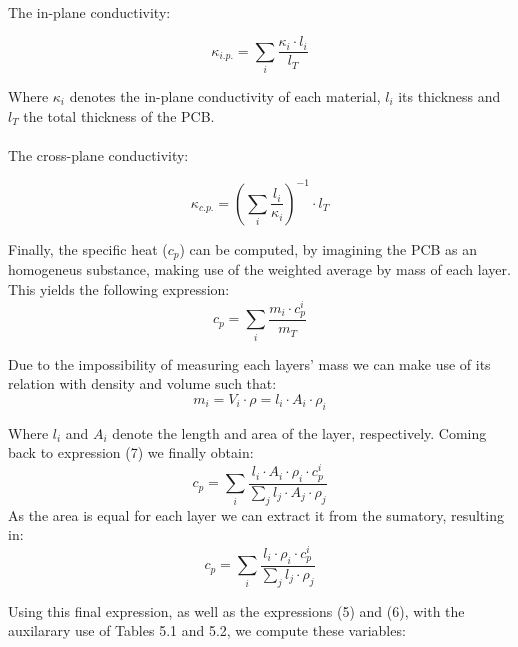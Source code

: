 \paragraph{}
The in-plane conductivity:

\begin{equation}
    \kappa_{i.p.}=\sum_i \frac{\kappa_i \cdot l_i }{l_T}
\end{equation}

Where $\kappa_i$ denotes the in-plane conductivity of each material, $l_i$ its thickness and $l_T$ the total thickness
of the PCB.

\paragraph{}
The cross-plane conductivity:

\begin{equation}
    \kappa_{c.p.}=\left( \sum_i \frac{l_i}{\kappa_i} \right)^{-1} \cdot l_T
\end{equation}

Finally, the specific heat ($c_p$) can be computed, by imagining the PCB as an homogeneus substance, making
use of the weighted average by mass of each layer. This yields the following expression:
\begin{equation}
    c_p=\sum_i \frac{m_i \cdot c_p^i}{m_T}
\end{equation}

Due to the impossibility of measuring each layers' mass we can make use of its relation with density and volume
such that:
\begin{equation}
    m_i=V_i\cdot \rho = l_i \cdot A_i \cdot \rho_i
\end{equation}

Where $l_i$ and $A_i$ denote the length and area of the layer, respectively. Coming back to expression (7)
we finally obtain:
\begin{equation}
    c_p= \sum_i \frac{l_i \cdot A_i \cdot \rho_i \cdot c_p^i}{\sum_j l_j \cdot A_j \cdot \rho_j }
\end{equation}
As the area is equal for each layer we can extract it from the sumatory, resulting in:
\begin{equation}
    c_p= \sum_i \frac{l_i \cdot \rho_i \cdot c_p^i}{\sum_j l_j \cdot \rho_j }
\end{equation}

Using this final expression, as well as the expressions (5) and (6), with the auxilarary use of Tables 5.1
and 5.2, we compute these variables:

